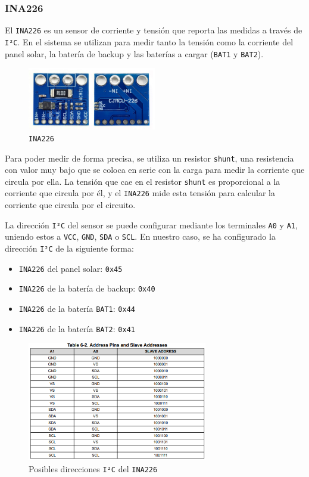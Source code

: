 \subsubsection{INA226}

El \texttt{INA226} es un sensor de corriente y tensión que reporta las medidas a través de \texttt{I²C}. En el sistema se utilizan para medir tanto la tensión como la corriente del panel solar, la batería de backup y las baterías a cargar (\texttt{BAT1} y \texttt{BAT2}).\cite{texasinstrumentsINA22636V16Bit}

\begin{figure}[H]
    \centering
    \includegraphics[width=0.5\textwidth]{images/2-hardware/componentes/INA226.jpg}
    \caption{\texttt{INA226}}
    \label{fig:hardware/modulos/ina226}
\end{figure}

Para poder medir de forma precisa, se utiliza un resistor \texttt{shunt}, una resistencia con valor muy bajo que se coloca en serie con la carga para medir la corriente que circula por ella. La tensión que cae en el resistor \texttt{shunt} es proporcional a la corriente que circula por él, y el \texttt{INA226} mide esta tensión para calcular la corriente que circula por el circuito.

La dirección \texttt{I²C} del sensor se puede configurar mediante los terminales \texttt{A0} y \texttt{A1}, uniendo estos a \texttt{VCC}, \texttt{GND}, \texttt{SDA} o \texttt{SCL}. En nuestro caso, se ha configurado la dirección \texttt{I²C} de la siguiente forma:

\begin{itemize}
    \item \texttt{INA226} del panel solar: \texttt{0x45}
    \item \texttt{INA226} de la batería de backup: \texttt{0x40}
    \item \texttt{INA226} de la batería \texttt{BAT1}: \texttt{0x44}
    \item \texttt{INA226} de la batería \texttt{BAT2}: \texttt{0x41}
\end{itemize}

\begin{figure}[H]
    \centering
    \includegraphics[width=0.7\textwidth]{images/2-hardware/componentes/direcciones_ina.png}
    \caption{Posibles direcciones \texttt{I²C} del \texttt{INA226}}
    \label{fig:hardware/modulos/direcciones_ina}
\end{figure}